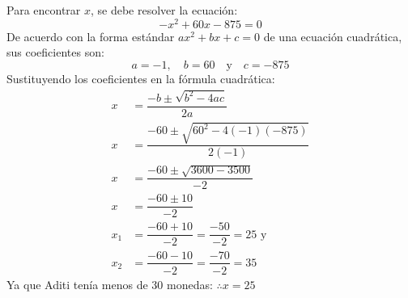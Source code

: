\begin{parts}
    \begin{solutionbox}{13cm}
        Para encontrar $x$, se debe resolver la ecuación:
        \[-x^2+60x-875  =0 \]
        De acuerdo con la forma estándar $ax^2 + bx + c = 0$ de una ecuación cuadrática, sus coeficientes son:
        \[a=-1, \quad b=60 \quad \text{y} \quad c=-875\]
        Sustituyendo los coeficientes en la fórmula cuadrática:
        \begin{align*}
            x   & = \dfrac{-b\pm\sqrt{b^2-4ac}}{2a}                  \\[1.2em]
            x   & = \dfrac{-60\pm\sqrt{60^2-4(-1)(-875)}}{2(-1)}     \\[1.2em]
            x   & = \dfrac{-60\pm\sqrt{3600-3500}}{-2}               \\[1.2em]
            x   & = \dfrac{-60\pm 10}{-2}                            \\[1.2em]
            x_1 & = \dfrac{-60+10}{-2}=\dfrac{-50}{-2}=25 \text{ y } \\[1.2em]
            x_2 & = \dfrac{-60-10}{-2}=\dfrac{-70}{-2}=35
        \end{align*}
        Ya que Aditi tenía menos de 30 monedas:
        $\therefore x=25$
    \end{solutionbox}
\end{parts}